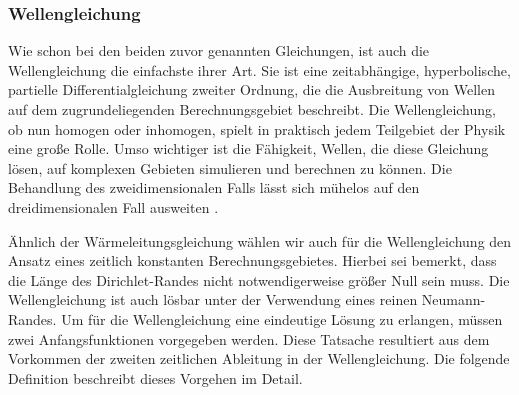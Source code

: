 \documentclass[crop=false]{standalone}
\begin{document}
      \subsubsection{Wellengleichung} %
      \label{ssub:wellengleichung}
        Wie schon bei den beiden zuvor genannten Gleichungen, ist auch die Wellengleichung die einfachste ihrer Art.
        Sie ist eine zeitabhängige, hyperbolische, partielle Differentialgleichung zweiter Ordnung, die die Ausbreitung von Wellen auf dem zugrundeliegenden Berechnungsgebiet beschreibt.
        Die Wellengleichung, ob nun homogen oder inhomogen, spielt in praktisch jedem Teilgebiet der Physik eine große Rolle.
        Umso wichtiger ist die Fähigkeit, Wellen, die diese Gleichung lösen, auf komplexen Gebieten simulieren und berechnen zu können.
        Die Behandlung des zweidimensionalen Falls lässt sich mühelos auf den dreidimensionalen Fall ausweiten \cite[S.~229~ff]{Schweizer2013}.

        Ähnlich der Wärmeleitungsgleichung wählen wir auch für die Wellengleichung den Ansatz eines zeitlich konstanten Berechnungsgebietes.
        Hierbei sei bemerkt, dass die Länge des Dirichlet-Randes nicht notwendigerweise größer Null sein muss.
        Die Wellengleichung ist auch lösbar unter der Verwendung eines reinen Neumann-Randes.
        Um für die Wellengleichung eine eindeutige Lösung zu erlangen, müssen zwei Anfangsfunktionen vorgegeben werden.
        Diese Tatsache resultiert aus dem Vorkommen der zweiten zeitlichen Ableitung in der Wellengleichung.
        Die folgende Definition beschreibt dieses Vorgehen im Detail.
        \cite{Schweizer2013}
\end{document}

